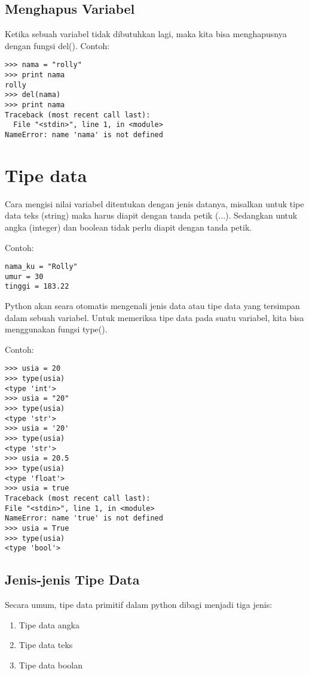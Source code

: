 \subsection{Menghapus Variabel}
Ketika sebuah variabel tidak dibutuhkan lagi, maka kita bisa menghapusnya dengan fungsi del().
Contoh:
\begin{verbatim}
>>> nama = "rolly"
>>> print nama
rolly
>>> del(nama)
>>> print nama
Traceback (most recent call last):
  File "<stdin>", line 1, in <module>
NameError: name 'nama' is not defined
\end{verbatim}

\section{Tipe data}
Cara mengisi nilai variabel ditentukan dengan jenis datanya, misalkan untuk tipe data teks (string) maka harus diapit dengan tanda petik (...). Sedangkan untuk angka (integer) dan boolean tidak perlu diapit dengan tanda petik.

Contoh:

\begin{verbatim}
nama_ku = "Rolly"
umur = 30
tinggi = 183.22
\end{verbatim}

Python akan seara otomatis mengenali jenis data atau tipe data yang tersimpan dalam sebuah variabel. Untuk memeriksa tipe data pada suatu variabel, kita bisa menggunakan fungsi type().

Contoh:

\begin{verbatim}
>>> usia = 20
>>> type(usia)
<type 'int'>
>>> usia = "20"
>>> type(usia)
<type 'str'>
>>> usia = '20'
>>> type(usia)
<type 'str'>
>>> usia = 20.5
>>> type(usia)
<type 'float'>
>>> usia = true
Traceback (most recent call last):
File "<stdin>", line 1, in <module>
NameError: name 'true' is not defined
>>> usia = True
>>> type(usia)
<type 'bool'>
\end{verbatim}

\subsection{Jenis-jenis Tipe Data}

Secara umum, tipe data primitif dalam python dibagi menjadi tiga jenis:

\begin{enumerate}
\item Tipe data angka
\item Tipe data teks
\item Tipe data boolan
\end{enumerate}

